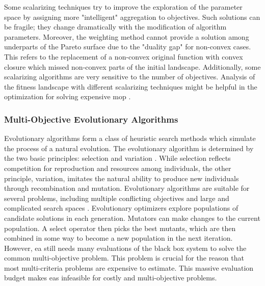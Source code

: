                 Some scalarizing techniques try to improve the exploration of the parameter space by assigning more "intelligent" aggregation to objectives. Such solutions can be fragile; they change dramatically with the modification of algorithm parameters. Moreover, the weighting method cannot provide a solution among underparts of the Pareto surface due to the "duality gap" for non-convex cases. This refers to the replacement of a non-convex original function with convex closure which missed non-convex parts of the initial landscape. Additionally, some scalarizing algorithms are very sensitive to the number of objectives. Analysis of the fitness landscape with different scalarizing techniques might be helpful in the optimization for solving expensive \gls{mop} \cite{ChughScal2019}.



            \subsubsection{Multi-Objective Evolutionary Algorithms}
            Evolutionary algorithms form a class of heuristic search methods which simulate the process of a natural evolution. The evolutionary algorithm is determined by the two basic principles: selection and variation \cite{TutMOEABrockhoff}. While selection reflects competition for reproduction and resources among individuals, the other principle, variation, imitates the natural ability to produce new individuals through recombination and mutation. 
            Evolutionary algorithms are suitable for several problems, including multiple conflicting objectives and large and complicated search spaces \cite{Andersson00asurvey, RamirezRV19}. Evolutionary optimizers explore populations of candidate solutions in each generation. Mutators can make changes to the current population. A select operator then picks the best mutants, which are then combined in some way to become a new population in the next iteration. However, \gls{ea} still needs many evaluations of the black box system to solve the common multi-objective problem. This problem is crucial for the reason that most multi-criteria problems are expensive to estimate. This massive evaluation budget makes \gls{ea}s infeasible for costly and multi-objective problems.  


